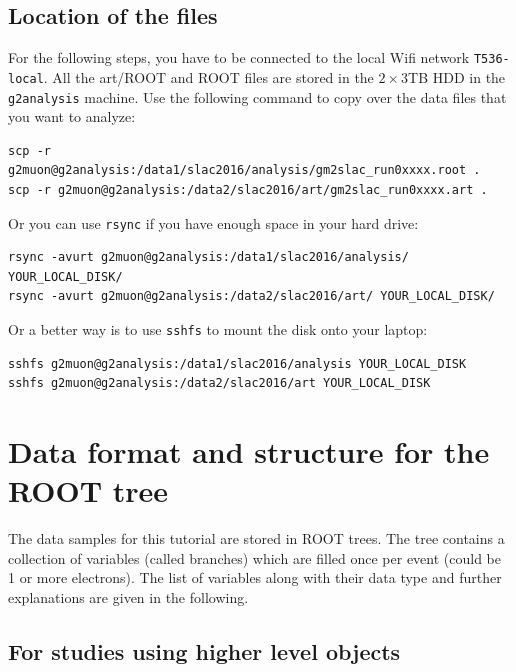 \documentclass[12pt,letterpaper]{article}
\begin{document}
\subsection{Location of the files}

For the following steps, you have to be connected to the local Wifi network \verb+T536-local+.
All the art/ROOT and ROOT files are stored in the $2\times3$TB HDD in the \verb+g2analysis+ machine.
Use the following command to copy over the data files that you want to analyze: 
%
\begin{lstlisting}[frame=single, basicstyle=\ttfamily\footnotesize]
scp -r g2muon@g2analysis:/data1/slac2016/analysis/gm2slac_run0xxxx.root . 
scp -r g2muon@g2analysis:/data2/slac2016/art/gm2slac_run0xxxx.art .
\end{lstlisting}
%
Or you can use \verb+rsync+ if you have enough space in your hard drive:
%
\begin{lstlisting}[frame=single, basicstyle=\ttfamily\footnotesize]
rsync -avurt g2muon@g2analysis:/data1/slac2016/analysis/ YOUR_LOCAL_DISK/
rsync -avurt g2muon@g2analysis:/data2/slac2016/art/ YOUR_LOCAL_DISK/
\end{lstlisting}
%
Or a better way is to use \verb+sshfs+ to mount the disk onto your laptop:
\begin{lstlisting}[frame=single, basicstyle=\ttfamily\footnotesize]
sshfs g2muon@g2analysis:/data1/slac2016/analysis YOUR_LOCAL_DISK
sshfs g2muon@g2analysis:/data2/slac2016/art YOUR_LOCAL_DISK
\end{lstlisting}

\section{Data format and structure for the ROOT tree}
The data samples for this tutorial are stored in ROOT trees. The tree contains a collection of variables (called branches) which are filled once per event (could be 1 or more electrons). The list of variables along with their data type and further explanations are given in the following.

\subsection*{For studies using higher level objects}
\end{document}
